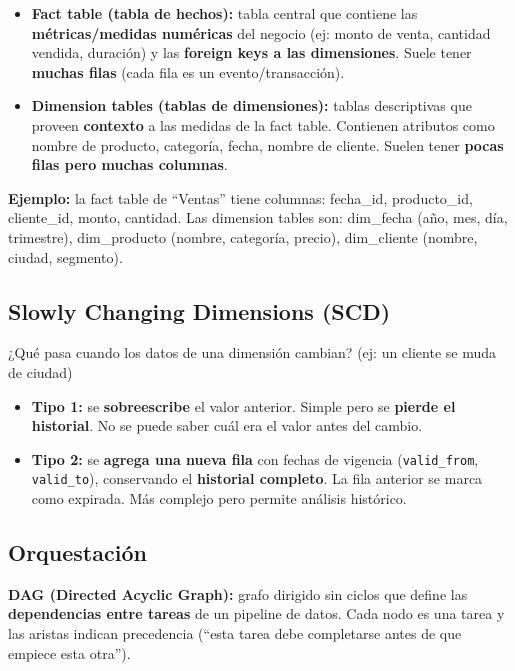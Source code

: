 \documentclass[11pt, a4paper]{article}
\begin{document}
\begin{itemize}
	\item \textbf{Fact table (tabla de hechos):} tabla central que contiene las \textbf{métricas/medidas numéricas} del negocio (ej: monto de venta, cantidad vendida, duración) y las \textbf{foreign keys a las dimensiones}. Suele tener \textbf{muchas filas} (cada fila es un evento/transacción).

	\item \textbf{Dimension tables (tablas de dimensiones):} tablas descriptivas que proveen \textbf{contexto} a las medidas de la fact table. Contienen atributos como nombre de producto, categoría, fecha, nombre de cliente. Suelen tener \textbf{pocas filas pero muchas columnas}.
\end{itemize}

\begin{recallbox}
	\textbf{Ejemplo:} la fact table de ``Ventas'' tiene columnas: fecha\_id, producto\_id, cliente\_id, monto, cantidad. Las dimension tables son: dim\_fecha (año, mes, día, trimestre), dim\_producto (nombre, categoría, precio), dim\_cliente (nombre, ciudad, segmento).
\end{recallbox}

\subsection{Slowly Changing Dimensions (SCD)}

¿Qué pasa cuando los datos de una dimensión cambian? (ej: un cliente se muda de ciudad)

\begin{itemize}
	\item \textbf{Tipo 1:} se \textbf{sobreescribe} el valor anterior. Simple pero se \textbf{pierde el historial}. No se puede saber cuál era el valor antes del cambio.

	\item \textbf{Tipo 2:} se \textbf{agrega una nueva fila} con fechas de vigencia (\texttt{valid\_from}, \texttt{valid\_to}), conservando el \textbf{historial completo}. La fila anterior se marca como expirada. Más complejo pero permite análisis histórico.
\end{itemize}

\subsection{Orquestación}

\textbf{DAG (Directed Acyclic Graph):} grafo dirigido sin ciclos que define las \textbf{dependencias entre tareas} de un pipeline de datos. Cada nodo es una tarea y las aristas indican precedencia (``esta tarea debe completarse antes de que empiece esta otra'').
\end{document}
